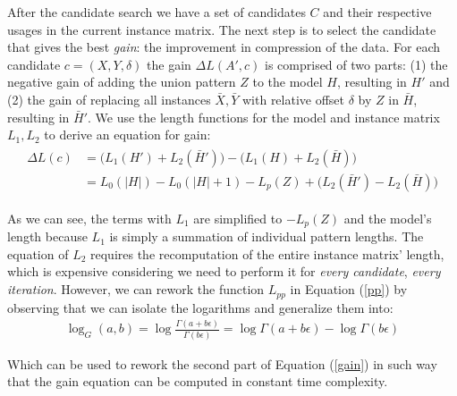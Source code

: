 \documentclass{llncs}
\begin{document}
After the candidate search we have a set of candidates $C$ and their respective usages in the current instance matrix. The next step is to select the candidate that gives the best \emph{gain}: the improvement in compression of the data. For each candidate $c=(X,Y,\delta)$ the gain $\Delta L(A',c)$  is comprised of two parts: (1) the negative gain of adding the union pattern $Z$ to the model $H$, resulting in $H'$ and (2) the gain of replacing all instances $\bar{X},\bar{Y}$ with relative offset $\delta$ by $Z$ in $\bar{H}$, resulting in $\bar{H}'$. We use the length functions for the model and instance matrix $L_1, L_2$ to derive an equation for gain:
\begin{align}
\label{gain}
\begin{split}
	\Delta L(c) &= \Big(L_1(H') + L_2(\bar{H}') \Big) - \Big(L_1(H) + L_2(\bar{H}) \Big) \\
			    &= L_0(|H|) - L_0(|H|+1) - L_p(Z) + \Big(L_2(\bar{H}') - L_2(\bar{H}) \Big)
\end{split}
\end{align}

As we can see, the terms with $L_1$ are simplified to $- L_p(Z)$ and the model's length because $L_1$ is simply a summation of individual pattern lengths. The equation of $L_2$ requires the recomputation of the entire instance matrix' length, which is expensive considering we need to perform it for \emph{every candidate}, \emph{every iteration}. However, we can rework the function $L_{pp}$ in Equation (\ref{pp}) by observing that we can isolate the logarithms and generalize them into:
\begin{align}
	\log_G(a,b) = \log \frac{\Gamma(a+ b\epsilon)}{\Gamma(b\epsilon)} = \log \Gamma(a+ b\epsilon) - \log \Gamma(b\epsilon)
\end{align} 

\noindent Which can be used to rework the second part of Equation (\ref{gain}) in such way that the gain equation can be computed in constant time complexity.
\end{document}
